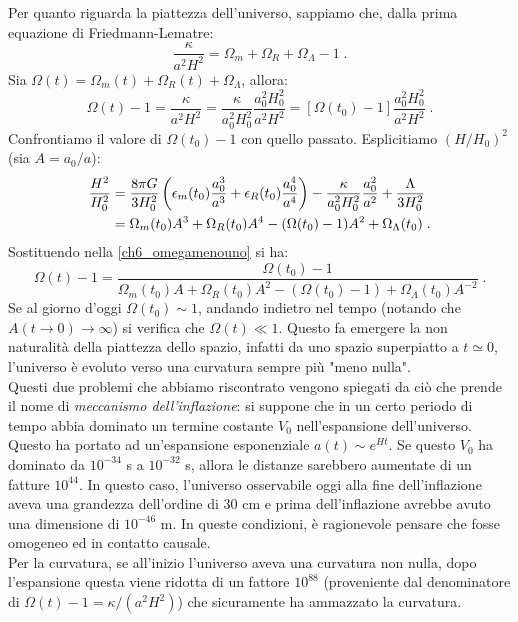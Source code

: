 \documentclass[12pt,a4paper]{report}
\theoremstyle{definition}
\begin{document}
Per quanto riguarda la piattezza dell'universo, sappiamo che, dalla prima equazione di Friedmann-Lematre:
$$
\frac{\kappa}{a^2H^2}=\Omega_m+\Omega_R+\Omega_{\Lambda}-1\;.
$$
Sia $\Omega(t)=\Omega_m(t)+\Omega_R(t)+\Omega_{\Lambda}$, allora:
\begin{equation}
\Omega(t)-1=\frac{\kappa}{a^2H^2}=\frac{\kappa}{a_0^2H_0^2}\frac{a_0^2H_0^2}{a^2H^2}=\left[\Omega(t_0)-1\right]\frac{a_0^2H_0^2}{a^2H^2}\;. \label{ch6_omegamenouno}
\end{equation}
Confrontiamo il valore di $\Omega(t_0)-1$ con quello passato. Esplicitiamo $(H/H_0)^2$ (sia $A=a_0/a$):
\begin{align}
\frac{H^2}{H_0^2}&=\frac{8\pi G}{3H_0^2}\left(\epsilon_m(t_0)\frac{a_0^3}{a^3}+\epsilon_R(t_0)\frac{a_0^4}{a^4}\right)-\frac{\kappa}{a_0^2H_0^2}\frac{a_0^2}{a^2}+\frac{\Lambda}{3H_0^2} \notag \\
&=\Omega_m(t_0)A^3+\Omega_R(t_0)A^4-(\Omega(t_0)-1)A^2+\Omega_{\Lambda}(t_0)\;.
\end{align}
Sostituendo nella \eqref{ch6_omegamenouno} si ha:
\begin{equation}
\Omega(t)-1=\frac{\Omega(t_0)-1}{\Omega_m(t_0)A+\Omega_R(t_0)A^2-(\Omega(t_0)-1)+\Omega_{\Lambda}(t_0)A^{-2}}\;.
\end{equation}
Se al giorno d'oggi $\Omega(t_0)\sim 1$, andando indietro nel tempo (notando che $A(t\to 0)\to\infty$) si verifica che $\Omega(t)\ll 1$. Questo fa emergere la non naturalità della piattezza dello spazio, infatti da uno spazio superpiatto a $t\simeq 0$, l'universo è evoluto verso una curvatura sempre più "meno nulla". \\
Questi due problemi che abbiamo riscontrato vengono spiegati da ciò che prende il nome di \emph{meccanismo dell'inflazione}: si suppone che in un certo periodo di tempo abbia dominato un termine costante $V_0$ nell'espansione dell'universo. Questo ha portato ad un'espansione esponenziale $a(t)\sim e^{Ht}$. Se questo $V_0$ ha dominato da $10^{-34}$ s a $10^{-32}$ s, allora le distanze sarebbero aumentate di un fatture $10^{44}$. In questo caso, l'universo osservabile oggi alla fine dell'inflazione aveva una grandezza dell'ordine di $30$ cm e prima dell'inflazione avrebbe avuto una dimensione di $10^{-46}$ m. In queste condizioni, è ragionevole pensare che fosse omogeneo ed in contatto causale. \\
Per la curvatura, se all'inizio l'universo aveva una curvatura non nulla, dopo l'espansione questa viene ridotta di un fattore $10^{88}$ (proveniente dal denominatore di $\Omega(t)-1=\kappa/(a^2H^2)$) che sicuramente ha ammazzato la curvatura.
\end{document}
